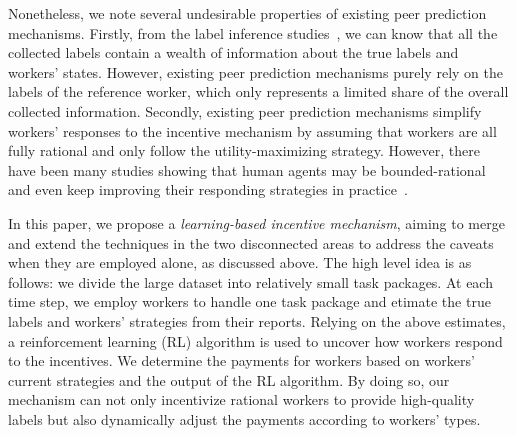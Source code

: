 Nonetheless, we note several undesirable properties of existing peer prediction mechanisms.
Firstly, from the label inference studies~\cite{zheng2017truth}, we can know that all the collected labels contain a wealth of information about the true labels and workers' states.
However, existing peer prediction mechanisms purely rely on the labels of the reference worker, which only represents a limited share of the overall collected information.
Secondly, existing peer prediction mechanisms simplify workers' responses to the incentive mechanism by assuming that workers are all fully rational and only follow the utility-maximizing strategy.
However, there have been many studies showing that human agents may be bounded-rational and even keep improving their responding strategies in practice~\cite{simon1982models,mckelvey1995quantal,chastain2014algorithms}.




In this paper, we propose a \emph{learning-based incentive mechanism}, aiming to merge and extend the techniques in the two disconnected areas to address the caveats when they are employed alone, as discussed above.
The high level idea is as follows: we divide the large dataset into relatively small task packages. At each time step, we employ workers to handle one task package and etimate the true labels and workers' strategies from their reports.
Relying on the above estimates, a reinforcement learning (RL) algorithm is used to uncover how workers respond to the incentives.
We determine the payments for workers based on workers' current strategies and the output of the RL algorithm.
By doing so, our mechanism can not only incentivize rational workers to provide high-quality labels but also dynamically adjust the payments according to workers' types.





